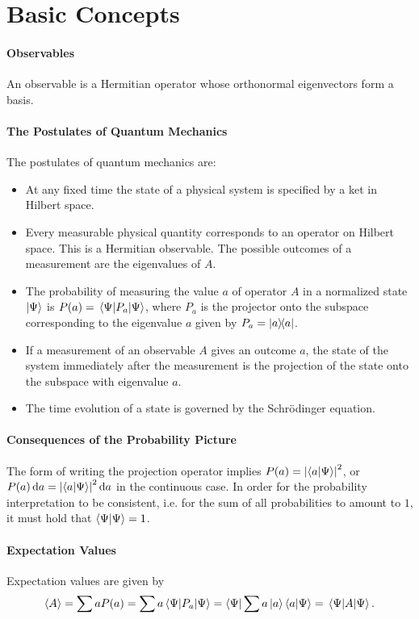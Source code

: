 \section{Basic Concepts}

\paragraph{Observables}
An observable is a Hermitian operator whose orthonormal eigenvectors form a basis.

\paragraph{The Postulates of Quantum Mechanics}
The postulates of quantum mechanics are:
\begin{itemize}
	\item At any fixed time the state of a physical system is specified by a ket in Hilbert space.
	\item Every measurable physical quantity corresponds to an operator on Hilbert space. This is a Hermitian observable. The possible outcomes of a measurement are the eigenvalues of $A$.
	\item The probability of measuring the value $a$ of operator $A$ in a normalized state $\ket{\Psi}$ is $P(a) = \expval{P_{a}}{\Psi}$, where $P_{a}$ is the projector onto the subspace corresponding to the eigenvalue $a$ given by $P_{a} = \dyad{a}{a}$.
	\item If a measurement of an observable $A$ gives an outcome $a$, the state of the system immediately after the measurement is the projection of the state onto the subspace with eigenvalue $a$.
	\item The time evolution of a state is governed by the Schrödinger equation.
\end{itemize}

\paragraph{Consequences of the Probability Picture}
The form of writing the projection operator implies $P(a) = \abs{\bra{a}\ket{\Psi}}^{2}$, or $P(a)\dd{a} = \abs{\bra{a}\ket{\Psi}}^{2}\dd{a}$ in the continuous case. In order for the probability interpretation to be consistent, i.e. for the sum of all probabilities to amount to $1$, it must hold that $\bra{\Psi}\ket{\Psi} = 1$.

\paragraph{Expectation Values}
Expectation values are given by
\begin{align*}
	\expval{A} = \sum aP(a) = \sum a\expval{P_{a}}{\Psi} = \bra{\Psi}\sum a\ket{a}\bra{a}\ket{\Psi} = \expval{A}{\Psi}.
\end{align*}

